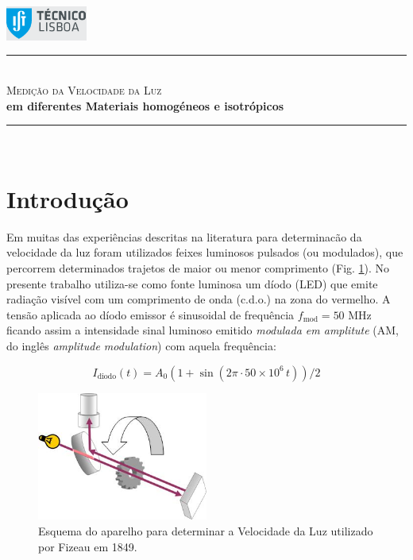 \documentclass[a4paper,12pt]{article}      %
\author{Prof. Bernardo B. Carvalho}
\date{ Outubro 2012}
\newcommand{\HRule}{\rule{\linewidth}{0.5mm}}
\begin{document}
 

	\includegraphics[width=0.2\textwidth]{../logo-ist}%

	\HRule \\[0.5cm]
	{ \huge \sf  \textsc{Medição da Velocidade da Luz} }\\[0.4cm] %
	{ \large \bfseries em diferentes Materiais homogéneos e isotrópicos}\\
	\HRule \\%


\section{\sf Introdução}
Em muitas das experiências descritas na literatura para
determinacão da velocidade da luz foram utilizados feixes luminosos
pulsados (ou modulados), que percorrem determinados trajetos de maior ou menor
comprimento (Fig. \ref{fig:Fizeau}). 
No presente trabalho utiliza-se como fonte luminosa um díodo (LED) que
emite radiação  visível com um comprimento de onda (c.d.o.) na
zona do vermelho. A tensão aplicada ao díodo emissor é 
sinusoidal de frequência $f_{\textrm{mod}}=50$ MHz ficando assim a intensidade sinal luminoso
 emitido \emph{modulada em amplitute} (AM, do inglês \emph{amplitude modulation}) com aquela frequência: 

\begin{equation*}
	\label{eq:f_am}
		I_{\textrm{diodo}}(t) = A_0 (1+ \sin ( 2\pi \cdot 50\times 10^6 \, t))/2
\end{equation*}

\begin{figure}
	[ht!b]  \centering 
	\includegraphics[width=0.5\textwidth]{Fizeau}
	\caption{Esquema do aparelho para determinar a Velocidade da Luz utilizado por Fizeau em 1849. \label{fig:Fizeau}} 
\end{figure}
\end{document}
